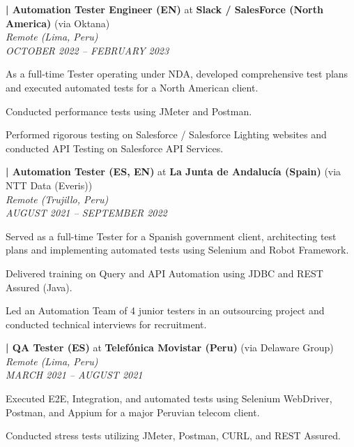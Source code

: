 \item \label{job:oktana}
\textbf{\thejobcounter | Automation Tester Engineer (EN)} at \textbf{Slack / SalesForce (North America)} (via Oktana) \\
\textit{Remote (Lima, Peru)} \\
\textit{OCTOBER 2022 -- FEBRUARY 2023}
\resumeItemListStart
    \item As a full-time Tester operating under NDA, developed comprehensive test plans and executed automated tests for a North American client.
    \item Conducted performance tests using JMeter and Postman.
    \item Performed rigorous testing on Salesforce / Salesforce Lighting websites and conducted API Testing on Salesforce API Services.
\resumeItemListEnd

\item \label{job:ntt}
\textbf{\thejobcounter | Automation Tester (ES, EN)} at \textbf{La Junta de Andalucía (Spain)} (via NTT Data (Everis)) \\
\textit{Remote (Trujillo, Peru)} \\
\textit{AUGUST 2021 -- SEPTEMBER 2022}
\resumeItemListStart
    \item Served as a full-time Tester for a Spanish government client, architecting test plans and implementing automated tests using Selenium and Robot Framework.
    \item Delivered training on Query and API Automation using JDBC and REST Assured (Java).
    \item Led an Automation Team of 4 junior testers in an outsourcing project and conducted technical interviews for recruitment.
\resumeItemListEnd

\item \label{job:delaware}
\textbf{\thejobcounter | QA Tester (ES)} at \textbf{Telefónica Movistar (Peru)} (via Delaware Group) \\
\textit{Remote (Lima, Peru)} \\
\textit{MARCH 2021 -- AUGUST 2021}
\resumeItemListStart
    \item Executed E2E, Integration, and automated tests using Selenium WebDriver, Postman, and Appium for a major Peruvian telecom client.
    \item Conducted stress tests utilizing JMeter, Postman, CURL, and REST Assured.
\resumeItemListEnd

